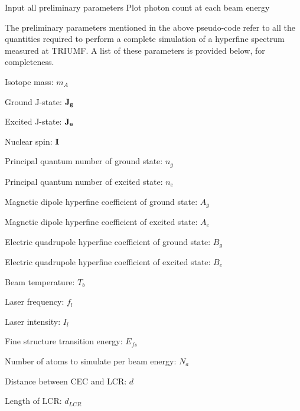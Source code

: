 \vspace{10mm}
\begin{algorithm}[H]
\SetAlgoLined
{}
 Input all preliminary parameters\;
 Plot photon count at each beam energy\;
 \caption{Pseudo-code for the simulation of a complete hyperfine spectrum.}
\end{algorithm}

\vspace{10mm}
The preliminary parameters mentioned in the above pseudo-code refer to all the quantities required to perform a complete simulation of a hyperfine spectrum measured at TRIUMF. A list of these parameters is provided below, for completeness.

\begin{list}{•}{List of Preliminary Parameters and Their Symbols}
\item Isotope mass: $m_A$
\item Ground J-state: $\bf{J}_g$
\item Excited J-state: $\bf{J}_e$
\item Nuclear spin: $\bf{I}$
\item Principal quantum number of ground state: $n_g$
\item Principal quantum number of excited state: $n_e$
\item Magnetic dipole hyperfine coefficient of ground state: $A_g$
\item Magnetic dipole hyperfine coefficient of excited state: $A_e$
\item Electric quadrupole hyperfine coefficient of ground state: $B_g$
\item Electric quadrupole hyperfine coefficient of excited state: $B_e$
\item Beam temperature: $T_b$
\item Laser frequency: $f_l$
\item Laser intensity: $I_l$
\item Fine structure transition energy: $E_{fs}$
\item Number of atoms to simulate per beam energy: $N_a$
\item Distance between CEC and LCR: $d$
\item Length of LCR: $d_{LCR}$
\end{list}